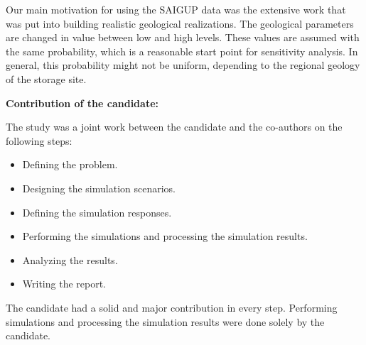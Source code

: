 {\begin{itemize}
Our main motivation for using the SAIGUP data was the extensive work that was put into building realistic geological realizations. The geological parameters are changed in value between low and high levels. These values are assumed with the same probability, which is a reasonable start point for sensitivity analysis. In general, this probability might not be uniform, depending to the regional geology of the storage site. 

\end{itemize}
\vspace{0.5cm}
\noindent\textbf{Contribution of the candidate:}

The study was a joint work between the candidate and the co-authors on the following steps:
\begin{itemize}
\item Defining the problem.
\item Designing the simulation scenarios.
\item Defining the simulation responses.
\item Performing the simulations  and processing the simulation results.
\item Analyzing the results.
\item Writing the report.
\end{itemize}

The candidate had a solid and major contribution in every step. Performing simulations and processing the simulation results were done solely by the candidate.

}%


